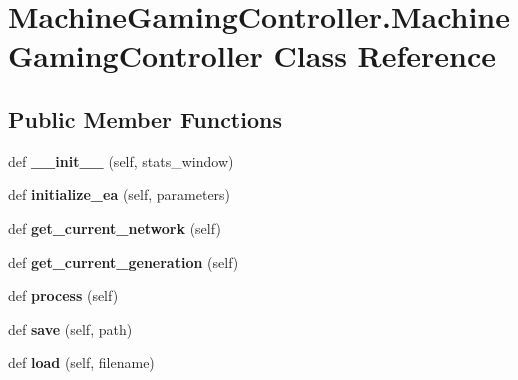 \hypertarget{classMachineGamingController_1_1MachineGamingController}{}\section{Machine\+Gaming\+Controller.\+Machine\+Gaming\+Controller Class Reference}
\label{classMachineGamingController_1_1MachineGamingController}
\subsection*{Public Member Functions}
\begin{DoxyCompactItemize}
\item 
def {\bfseries \+\_\+\+\_\+init\+\_\+\+\_\+} (self, stats\+\_\+window)\hypertarget{classMachineGamingController_1_1MachineGamingController_a0552527740e7e5e6a58d2babbe00387a}{}\label{classMachineGamingController_1_1MachineGamingController_a0552527740e7e5e6a58d2babbe00387a}

\item 
def {\bfseries initialize\+\_\+ea} (self, parameters)\hypertarget{classMachineGamingController_1_1MachineGamingController_a7eebd5e59bc078c01bf3057684c54547}{}\label{classMachineGamingController_1_1MachineGamingController_a7eebd5e59bc078c01bf3057684c54547}

\item 
def {\bfseries get\+\_\+current\+\_\+network} (self)\hypertarget{classMachineGamingController_1_1MachineGamingController_aa5f25a8c5bf4cbc0e9dc4f6ad7c1cce5}{}\label{classMachineGamingController_1_1MachineGamingController_aa5f25a8c5bf4cbc0e9dc4f6ad7c1cce5}

\item 
def {\bfseries get\+\_\+current\+\_\+generation} (self)\hypertarget{classMachineGamingController_1_1MachineGamingController_ac90fcf35b4ae810843b5420e1160b0c4}{}\label{classMachineGamingController_1_1MachineGamingController_ac90fcf35b4ae810843b5420e1160b0c4}

\item 
def {\bfseries process} (self)\hypertarget{classMachineGamingController_1_1MachineGamingController_a1bf9bfb9f213daf15538668353af3307}{}\label{classMachineGamingController_1_1MachineGamingController_a1bf9bfb9f213daf15538668353af3307}

\item 
def {\bfseries save} (self, path)\hypertarget{classMachineGamingController_1_1MachineGamingController_a3bfaf926c88d2d4658cac9a31d68cbc5}{}\label{classMachineGamingController_1_1MachineGamingController_a3bfaf926c88d2d4658cac9a31d68cbc5}

\item 
def {\bfseries load} (self, filename)\hypertarget{classMachineGamingController_1_1MachineGamingController_af74b190c4918ace93d1c02d06d95b33c}{}\label{classMachineGamingController_1_1MachineGamingController_af74b190c4918ace93d1c02d06d95b33c}

\end{DoxyCompactItemize}

